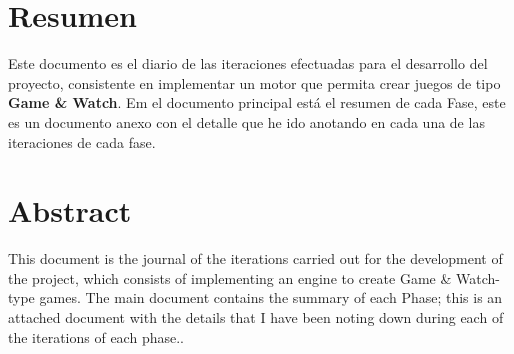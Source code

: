 \documentclass[12pt,twoside]{book}
\newcommand\paginablanco{%
    \null
    \thispagestyle{empty}%
    \newpage}
\begin{document}

\chapter*{Resumen} %

Este documento es el diario de las iteraciones efectuadas para el desarrollo del proyecto, consistente en implementar un motor que permita crear juegos de tipo \textbf{Game \& Watch}. Em el documento principal está el resumen de cada Fase, este es un documento anexo con el detalle que he ido anotando en cada una de las iteraciones de cada fase.

\chapter*{Abstract} %

This document is the journal of the iterations carried out for the development of the project, which consists of implementing an engine to create Game \& Watch-type games. The main document contains the summary of each Phase; this is an attached document with the details that I have been noting down during each of the iterations of each phase..

\tableofcontents %

\renewcommand{\lstlistingname}{Código}
\renewcommand{\lstlistlistingname}{Índice de códigos}

\lstlistoflistings %


\newpage

\paginablanco{}

\pagestyle{fancy}







\appendix



\clearpage


\end{document}
